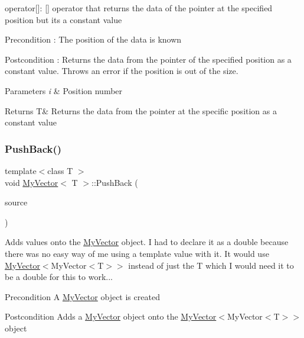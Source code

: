operator\mbox{[}\mbox{]}\+: \mbox{[}\mbox{]} operator that returns the data of the pointer at the specified position but it\textquotesingle{}s a constant value 

\begin{DoxyPrecond}{Precondition}
\+: The position of the data is known 
\end{DoxyPrecond}
\begin{DoxyPostcond}{Postcondition}
\+: Returns the data from the pointer of the specified position as a constant value. Throws an error if the position is out of the size. 
\end{DoxyPostcond}

\begin{DoxyParams}{Parameters}
{\em i} & Position number \\
\hline
\end{DoxyParams}
\begin{DoxyReturn}{Returns}
T\& Returns the data from the pointer at the specific position as a constant value 
\end{DoxyReturn}
\mbox{\label{class_my_vector_a1070a35184f1a8223a7df7f4fdd78492}} 
\subsubsection{\texorpdfstring{PushBack()}{PushBack()}}
{\footnotesize\ttfamily template$<$class T $>$ \\
void \mbox{\hyperlink{class_my_vector}{My\+Vector}}$<$ T $>$\+::Push\+Back (\begin{DoxyParamCaption}\item[{const \mbox{\hyperlink{class_my_vector}{My\+Vector}}$<$ double $>$ \&}]{source }\end{DoxyParamCaption})}



Adds values onto the \mbox{\hyperlink{class_my_vector}{My\+Vector}} object. I had to declare it as a double because there was no easy way of me using a template value with it. It would use \mbox{\hyperlink{class_my_vector}{My\+Vector}}$<$My\+Vector$<$\+T$>$$>$ instead of just the T which I would need it to be a double for this to work... 

\begin{DoxyPrecond}{Precondition}
A \mbox{\hyperlink{class_my_vector}{My\+Vector}} object is created 
\end{DoxyPrecond}
\begin{DoxyPostcond}{Postcondition}
Add\textquotesingle{}s a \mbox{\hyperlink{class_my_vector}{My\+Vector}} object onto the \mbox{\hyperlink{class_my_vector}{My\+Vector}}$<$My\+Vector$<$\+T$>$$>$ object
\end{DoxyPostcond}

